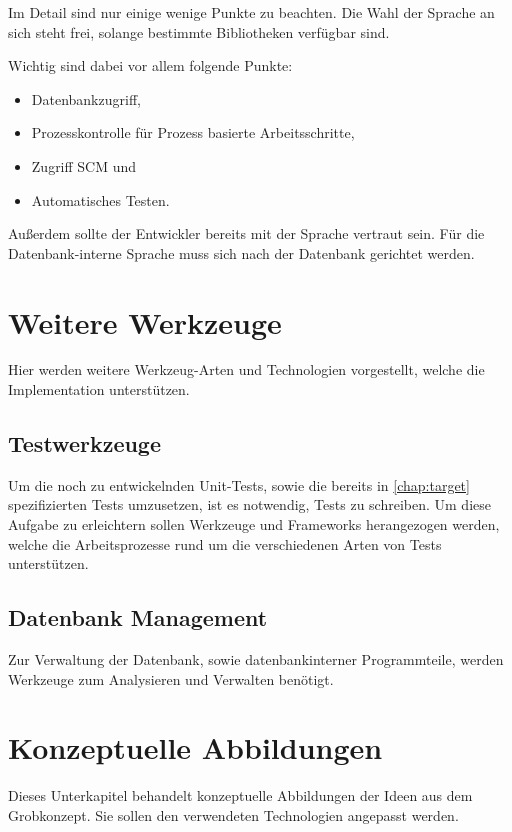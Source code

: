 Im Detail sind nur einige wenige Punkte zu beachten.
Die Wahl der Sprache an sich steht frei,
solange bestimmte Bibliotheken verf\"ugbar sind.

Wichtig sind dabei vor allem folgende Punkte:
\begin{itemize}
    \item Datenbankzugriff,
    \item Prozesskontrolle für Prozess basierte Arbeitsschritte,
    \item Zugriff SCM und
    \item Automatisches Testen.
\end{itemize}

Außerdem sollte der Entwickler bereits mit der Sprache vertraut sein.
Für die Datenbank-interne Sprache muss sich nach der Datenbank gerichtet werden.


\section{Weitere Werkzeuge}
\label{sec:tech:tools}

Hier werden weitere Werkzeug-Arten und Technologien vorgestellt,
welche die Implementation unterstützen.

\subsection{Testwerkzeuge}

Um die noch zu entwickelnden Unit-Tests,
sowie die bereits in \cref{chap:target} spezifizierten Tests umzusetzen,
ist es notwendig, Tests zu schreiben. Um diese Aufgabe zu erleichtern
sollen Werkzeuge und Frameworks herangezogen werden,
welche die Arbeitsprozesse rund um die verschiedenen Arten von Tests unterstützen.

\subsection{Datenbank Management}

Zur Verwaltung der Datenbank, sowie datenbankinterner Programmteile,
werden Werkzeuge zum Analysieren und Verwalten benötigt.


\section{Konzeptuelle Abbildungen}
\label{sec:tech:konzeptabbildung}

Dieses Unterkapitel behandelt konzeptuelle Abbildungen der Ideen aus dem Grobkonzept.
Sie sollen den verwendeten Technologien angepasst werden.

